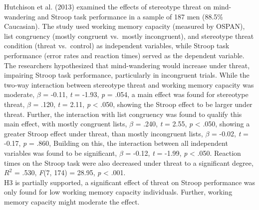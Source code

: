 \documentclass[
  stu, a4paper,floatsintext]{apa7}
\begin{document}
Hutchison et al. (2013) examined the effects of stereotype threat on mind-wandering and Stroop task performance in a sample of 187 men (88.5\% Caucasian). The study used working memory capacity (measured by OSPAN), list congruency (mostly congruent vs.~mostly incongruent), and stereotype threat condition (threat vs.~control) as independent variables, while Stroop task performance (error rates and reaction times) served as the dependent variable. The researchers hypothesized that mind-wandering would increase under threat, impairing Stroop task performance, particularly in incongruent trials.
While the two-way interaction between stereotype threat and working memory capacity was moderate, \(\beta\) = -0.11, \emph{t} = -1.93, \emph{p} = .054, a main effect was found for stereotype threat, \(\beta\) = .120, \emph{t} = 2.11, \emph{p} \textless{} .050, showing the Stroop effect to be larger under threat.
Further, the interaction with list congruency was found to qualify this main effect, with mostly congruent lists, \(\beta\) = .240, \emph{t} = 2.55, \emph{p} \textless{} .050, showing a greater Stroop effect under threat, than mostly incongruent lists, \(\beta\) = -0.02, \emph{t} = -0.17, \emph{p} = .860,
Building on this, the interaction between all independent variables was found to be significant, \(\beta\) = -0.12, \emph{t} = -1.99, \emph{p} \textless{} .050.
Reaction times on the Stroop task were also decreased under threat to a significant degree, \(R^2\) = .530, \emph{F}(7, 174) = 28.95, \emph{p} \textless{} .001.\\
H3 is partially supported, a significant effect of threat on Stroop performance was only found for low working memory capacity individuals.
Further, working memory capacity might moderate the effect.
\end{document}
